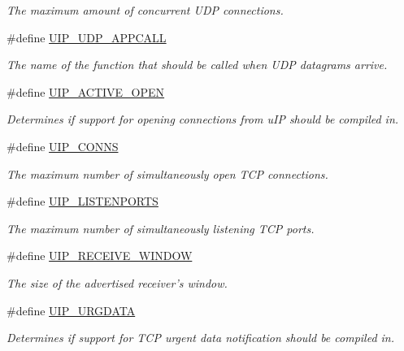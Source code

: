 \begin{CompactItemize}
\begin{CompactList}\small\item\em The maximum amount of concurrent UDP connections. \item\end{CompactList}\item 
\hypertarget{a00073_g3d768e989e308144190ae1a5ddfa9726}{
\#define \hyperlink{a00073_g3d768e989e308144190ae1a5ddfa9726}{UIP\_\-UDP\_\-APPCALL}}
\label{a00073_g3d768e989e308144190ae1a5ddfa9726}

\begin{CompactList}\small\item\em The name of the function that should be called when UDP datagrams arrive. \item\end{CompactList}\item 
\#define \hyperlink{a00074_gac0de06236b02659460445de30776e00}{UIP\_\-ACTIVE\_\-OPEN}
\begin{CompactList}\small\item\em Determines if support for opening connections from u\-IP should be compiled in. \item\end{CompactList}\item 
\#define \hyperlink{a00074_gf5fe83be78b78b9e7d9e7f1e34ab1cc5}{UIP\_\-CONNS}
\begin{CompactList}\small\item\em The maximum number of simultaneously open TCP connections. \item\end{CompactList}\item 
\#define \hyperlink{a00074_g8f4ebd8ef6c0ea665ed351d87fec09fd}{UIP\_\-LISTENPORTS}
\begin{CompactList}\small\item\em The maximum number of simultaneously listening TCP ports. \item\end{CompactList}\item 
\#define \hyperlink{a00074_g5b9dba2123705bce1ce95c3deca0bdad}{UIP\_\-RECEIVE\_\-WINDOW}
\begin{CompactList}\small\item\em The size of the advertised receiver's window. \item\end{CompactList}\item 
\#define \hyperlink{a00074_g51c1cd531ff0afb81620151f2248cd21}{UIP\_\-URGDATA}
\begin{CompactList}\small\item\em Determines if support for TCP urgent data notification should be compiled in. \item\end{CompactList}\item 

\end{CompactItemize}
